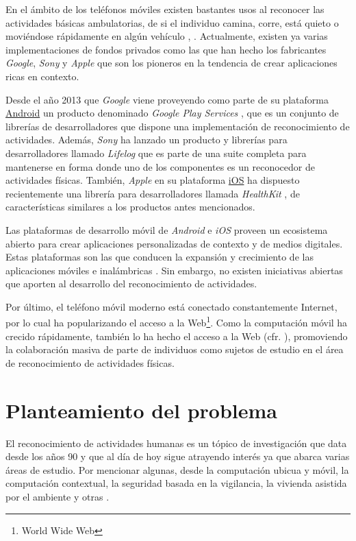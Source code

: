 En el ámbito de los teléfonos móviles existen bastantes usos al reconocer
las actividades básicas ambulatorias, de si el individuo camina, corre,
está quieto o moviéndose rápidamente en algún vehículo \cite{campuzano2015},
\cite{googlio2013}. Actualmente, existen ya varias implementaciones
de fondos privados como las que han hecho los fabricantes \emph{Google},
\emph{Sony} y \emph{Apple} que son los pioneros en la tendencia de
crear aplicaciones ricas en contexto.

Desde el año 2013 que \emph{Google} viene proveyendo como parte de
su plataforma \hyperlink{abbr}{Android} \cite{google2005and} un
producto denominado \emph{Google Play Services} \cite{googl2016loc},
que es un conjunto de librerías de desarrolladores que dispone una
implementación de reconocimiento de actividades. Además, \emph{Sony}
ha lanzado un producto y librerías para desarrolladores llamado \emph{Lifelog}
\cite{sony2016act} que es parte de una suite completa para mantenerse
en forma donde uno de los componentes es un reconocedor de actividades
físicas. También, \emph{Apple} en su plataforma \hyperlink{abbr}{iOS}
\cite{apple2007ios} ha dispuesto recientemente una librería para
desarrolladores llamada \emph{HealthKit} \cite{healthkit2016}, de
características similares a los productos antes mencionados. 

Las plataformas de desarrollo móvil de \emph{Android} e \emph{iOS
}proveen un ecosistema abierto para crear aplicaciones personalizadas
de contexto y de medios digitales. Estas plataformas son las que conducen
la expansión y crecimiento de las aplicaciones móviles e inalámbricas
\cite{Tanenbaum2010}. Sin embargo, no existen iniciativas abiertas
que aporten al desarrollo del reconocimiento de actividades.

Por último, el teléfono móvil moderno está conectado constantemente
Internet, por lo cual ha popularizando el acceso a la Web\footnote{World Wide Web}.
Como la computación móvil ha crecido rápidamente, también lo ha hecho
el acceso a la Web (cfr. \cite{nyt2008iph}), promoviendo la colaboración
masiva de parte de individuos como sujetos de estudio en el área de
reconocimiento de actividades físicas.

\section{Planteamiento del problema}

\label{planteamiento}

El reconocimiento de actividades humanas es un tópico de investigación
que data desde los años 90 y que al día de hoy sigue atrayendo interés
ya que abarca varias áreas de estudio. Por mencionar algunas, desde
la computación ubicua y móvil, la computación contextual, la seguridad
basada en la vigilancia, la vivienda asistida por el ambiente y otras
\cite{chen2012sensor}. 

